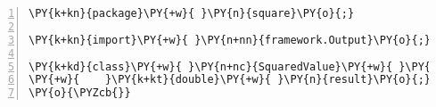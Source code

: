 \begin{Verbatim}[commandchars=\\\{\},numbers=left,firstnumber=1,stepnumber=1,frame=single,fontsize=\small]
\PY{k+kn}{package}\PY{+w}{ }\PY{n}{square}\PY{o}{;}

\PY{k+kn}{import}\PY{+w}{ }\PY{n+nn}{framework.Output}\PY{o}{;}

\PY{k+kd}{class}\PY{+w}{ }\PY{n+nc}{SquaredValue}\PY{+w}{ }\PY{k+kd}{implements}\PY{+w}{ }\PY{n}{Output}\PY{+w}{ }\PY{o}{\PYZob{}}
\PY{+w}{    }\PY{k+kt}{double}\PY{+w}{ }\PY{n}{result}\PY{o}{;}
\PY{o}{\PYZcb{}}
\end{Verbatim}
